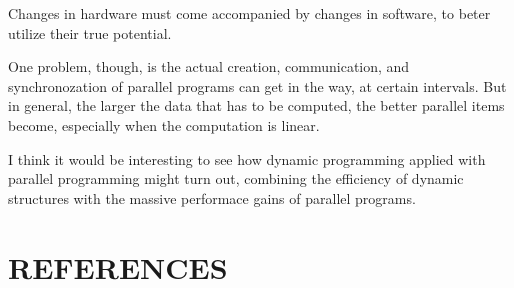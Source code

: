 \documentclass[dvips]{article}
\begin{document}
Changes in hardware must come accompanied by changes in software, to beter utilize their true potential. 

One problem, though, is the actual creation, communication, and synchronozation of parallel programs can get in the way, at certain intervals. But in general, the larger the data that has to be computed, the better parallel items become, especially when the computation is linear.

I think it would be interesting to see how dynamic programming applied with parallel programming might turn out, combining the efficiency of dynamic structures with the massive performace gains of parallel programs.
\section*{REFERENCES}

\begin{thebibliography}{99}


\end{thebibliography}
\end{document}
